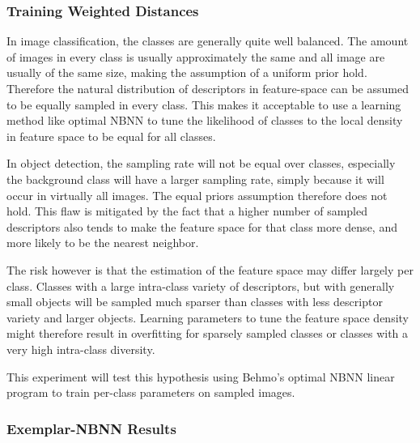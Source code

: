 \subsubsection{Training Weighted Distances} %
\label{ssub:training_weighted_distances}

In image classification, the classes are generally quite well balanced. The amount of images in every class is usually approximately the same and all image are usually of the same size, making the assumption of a uniform prior hold. Therefore the natural distribution of descriptors in feature-space can be assumed to be equally sampled in every class. This makes it acceptable to use a learning method like optimal NBNN \cite{behmo2010towards} to tune the likelihood of classes to the local density in feature space to be equal for all classes.

In object detection, the sampling rate will not be equal over classes, especially the background class will have a larger sampling rate, simply because it will occur in virtually all images. The equal priors assumption therefore does not hold. This flaw is mitigated by the fact that a higher number of sampled descriptors also tends to make the feature space for that class more dense, and more likely to be the nearest neighbor.

The risk however is that the estimation of the feature space may differ largely per class. Classes with a large intra-class variety of descriptors, but with generally small objects will be sampled much sparser than classes with less descriptor variety and larger objects. Learning parameters to tune the feature space density might therefore result in overfitting for sparsely sampled classes or classes with a very high intra-class diversity.

This experiment will test this hypothesis using Behmo's optimal NBNN linear program to train per-class parameters on sampled images.



\subsubsection{Exemplar-NBNN Results} %
\label{sub:exemplar_nbnn_results}

